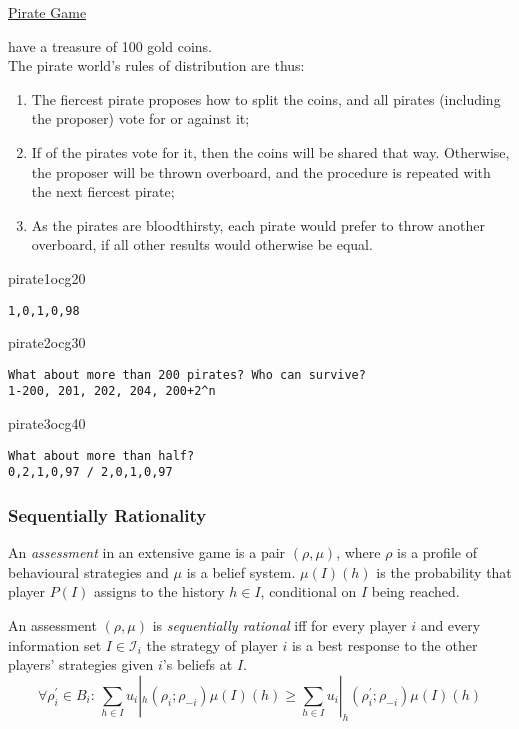\documentclass[UTF8,11pt,colorlinks,compress,openany]{beamer}%
\begin{document}
\begin{frame}[fragile]{\href{https://mp.weixin.qq.com/s/LLUoU0gl3t6GTh6jDef5vA}{Pirate Game}}
	\begin{problem}
		 have a treasure of 100 gold coins.\\
		The pirate world's rules of distribution are thus:
		\begin{enumerate}
			\item The fiercest pirate proposes how to split the coins, and all pirates (including the proposer) vote for or against it;
			\item If  of the pirates vote for it, then the coins will be shared that way. Otherwise, the proposer will be thrown overboard, and the procedure is repeated with the next fiercest pirate;
			\item As the pirates are bloodthirsty, each pirate would prefer to throw another overboard, if all other results would otherwise be equal.
		\end{enumerate}
	\end{problem}
\begin{ocg}{pirate1}{ocg2}{0}
\begin{verbatim}
1,0,1,0,98
\end{verbatim}
\end{ocg}
\begin{ocg}{pirate2}{ocg3}{0}
\begin{verbatim}
What about more than 200 pirates? Who can survive?
1-200, 201, 202, 204, 200+2^n
\end{verbatim}
\end{ocg}
\begin{ocg}{pirate3}{ocg4}{0}
\begin{verbatim}
What about more than half?
0,2,1,0,97 / 2,0,1,0,97
\end{verbatim}
\end{ocg}
\end{frame}

\begin{frame}\frametitle{Sequentially Rationality}
\begin{definition}[Assessment]
	An \emph{assessment} in an extensive game is a pair $(\rho,\mu)$, where $\rho$ is a profile of behavioural strategies and $\mu$ is a belief system. $\mu(I)(h)$ is the probability that player $P(I)$ assigns to the history $h\in I$, conditional on $I$ being reached.
\end{definition}
\begin{definition}
	An assessment $(\rho,\mu)$ is \emph{sequentially rational} iff for every player $i$ and every information set $I\in\mathcal{I}_i$ the strategy of player $i$ is a best response to the other players' strategies given $i$'s beliefs at $I$.
	\[\forall\rho_i^\prime\in B_i:\, \sum\limits_{h\in I}u_i|_h(\rho_i;\rho_{-i})\mu(I)(h)\geq\sum\limits_{h\in I}u_i|_h(\rho_i^\prime;\rho_{-i})\mu(I)(h)\]
\end{definition}
\end{frame}
\end{document}
